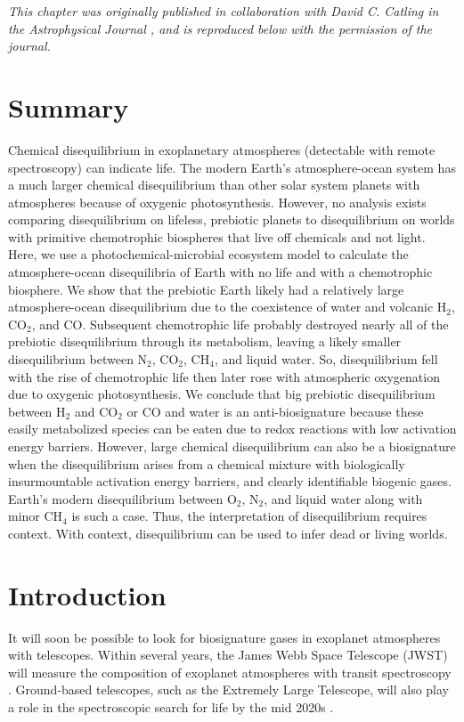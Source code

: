 
\noindent \textit{This chapter was originally published in collaboration with David C. Catling in the Astrophysical Journal \citep{Wogan_2020_diseq}, and is reproduced below with the permission of the journal.}

\section*{\centering Summary}

Chemical disequilibrium in exoplanetary atmospheres (detectable with remote spectroscopy) can indicate life. The modern Earth's atmosphere-ocean system has a much larger chemical disequilibrium than other solar system planets with atmospheres because of oxygenic photosynthesis. However, no analysis exists comparing disequilibrium on lifeless, prebiotic planets to disequilibrium on worlds with primitive chemotrophic biospheres that live off chemicals and not light. Here, we use a photochemical-microbial ecosystem model to calculate the atmosphere-ocean disequilibria of Earth with no life and with a chemotrophic biosphere. We show that the prebiotic Earth likely had a relatively large atmosphere-ocean disequilibrium due to the coexistence of water and volcanic H$_2$, CO$_2$, and CO. Subsequent chemotrophic life probably destroyed nearly all of the prebiotic disequilibrium through its metabolism, leaving a likely smaller disequilibrium between N$_2$, CO$_2$, CH$_4$, and liquid water. So, disequilibrium fell with the rise of chemotrophic life then later rose with atmospheric oxygenation due to oxygenic photosynthesis. We conclude that big prebiotic disequilibrium between H$_2$ and CO$_2$ or CO and water is an anti-biosignature because these easily metabolized species can be eaten due to redox reactions with low activation energy barriers. However, large chemical disequilibrium can also be a biosignature when the disequilibrium arises from a chemical mixture with biologically insurmountable activation energy barriers, and clearly identifiable biogenic gases. Earth's modern disequilibrium between O$_2$, N$_2$, and liquid water along with minor CH$_4$ is such a case. Thus, the interpretation of disequilibrium requires context. With context, disequilibrium can be used to infer dead or living worlds.

\section{Introduction}

It will soon be possible to look for biosignature gases in exoplanet atmospheres with telescopes. Within several years, the James Webb Space Telescope (JWST) will measure the composition of exoplanet atmospheres with transit spectroscopy \citep{Fischer_2019,Gaudi_2019}. Ground-based telescopes, such as the Extremely Large Telescope, will also play a role in the spectroscopic search for life by the mid 2020s \citep{Lopez_2019,Snellen_2013}.

